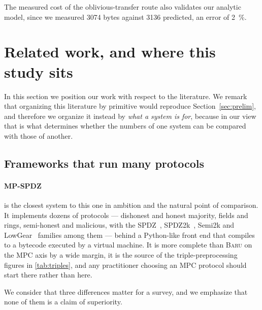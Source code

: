 \documentclass[11pt]{article}
\newcommand{\Baru}{\textsc{Baru}}
\begin{document}
The measured cost of the oblivious-transfer route also validates our analytic model, since we
measured \num{3074} bytes against \num{3136} predicted, an error of \SI{2}{\percent}.

\section{Related work, and where this study sits}
\label{sec:related}

In this section we position our work with respect to the literature. We remark that
organizing this literature by primitive would reproduce Section~\ref{sec:prelim}, and
therefore we organize it instead by \emph{what a system is for}, because in our view that is
what determines whether the numbers of one system can be compared with those of another.

\subsection{Frameworks that run many protocols}
\label{sec:related:frameworks}

\paragraph{MP-SPDZ~\cite{MPSPDZ}} is the closest system to this one in ambition and the
natural point of comparison. It implements dozens of protocols --- dishonest and honest
majority, fields and rings, semi-honest and malicious, with the SPDZ~\cite{SPDZ},
SPDZ2k~\cite{SPDZ2k}, Semi2k and LowGear~\cite{Overdrive} families among them --- behind a
Python-like front end that compiles to a bytecode executed by a virtual machine. It is more
complete than \Baru{} on the MPC axis by a wide margin, it is the source of the
triple-preprocessing figures in \cref{tab:triples}, and any practitioner choosing an MPC
protocol should start there rather than here.

We consider that three differences matter for a survey, and we emphasize that none of
them is a claim of superiority.
\end{document}
